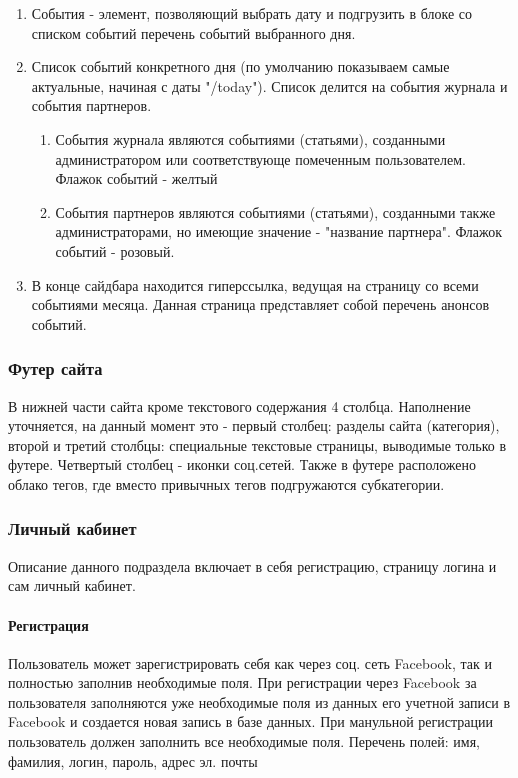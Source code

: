 \documentclass[DIV=calc, paper=a4, fontsize=11pt]{scrartcl} %
\begin{document}
\begin{enumerate}
\begin{enumerate}
        \end{enumerate}
    \item События - элемент, позволяющий выбрать дату и подгрузить в блоке со списком событий перечень событий выбранного дня.
    \item Список событий конкретного дня (по умолчанию показываем самые актуальные, начиная с даты "/today"). Список делится на события журнала и события партнеров.
        \begin{enumerate}
            \item События журнала являются событиями (статьями), созданными администратором или соответствующе помеченным пользователем. Флажок событий - желтый
            \item События партнеров являются событиями (статьями), созданными также администраторами, но имеющие значение - "название партнера". Флажок событий - розовый.
        \end{enumerate}
    \item В конце сайдбара находится гиперссылка, ведущая на страницу со всеми событиями месяца. Данная страница представляет собой перечень анонсов событий.
\end{enumerate}

\subsubsection{Футер сайта}
В нижней части сайта кроме текстового содержания 4 столбца. Наполнение уточняется, на данный момент это - первый столбец: разделы сайта (категория), второй и третий столбцы: специальные текстовые страницы, выводимые только в футере. Четвертый столбец - иконки соц.сетей. Также в футере расположено облако тегов, где вместо привычных тегов подгружаются субкатегории.

\subsubsection{Личный кабинет}
Описание данного подраздела включает в себя регистрацию, страницу логина и сам личный кабинет.

\paragraph{Регистрация}
Пользователь может зарегистрировать себя как через соц. сеть Facebook, так и полностью заполнив необходимые поля. 
При регистрации через Facebook за пользователя заполняются уже необходимые поля из данных его учетной записи в Facebook и создается новая запись в базе данных. При манульной регистрации пользователь должен заполнить все необходимые поля.
Перечень полей: имя, фамилия, логин, пароль, адрес эл. почты
\end{document}
